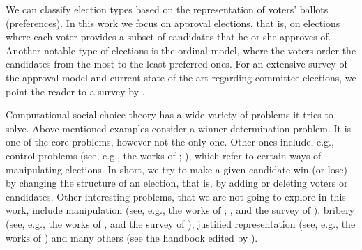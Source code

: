 We can classify election types based on the representation of voters' ballots (preferences).
In this work we focus on approval elections, that is, on elections where each voter provides a subset of candidates that he or she approves of.
Another notable type of elections is the ordinal model,
where the voters order the candidates from the most to the least preferred ones. 
For an extensive survey of the approval model and current state of the art
regarding committee elections, we point the reader to a survey by \cite{lacknerSkowronAVOverview}. 

Computational social choice theory has a wide variety of problems it tries to solve.
Above-mentioned examples consider a winner determination problem. It is one of the core problems, however not the only one.
Other ones include,
e.g.,
control problems (see, e.g., the works of \cite{bartholdi-control}; \cite{hemaspaandra-control}),
which refer to certain ways of manipulating elections.
In short, we try to make a given candidate win (or lose) by changing the structure of an election,
that is, by adding or deleting voters or candidates.
Other interesting problems, that we are not going to explore in this work,
include
manipulation (see, e.g., the works of \cite{bartholdi-manipulation}; \cite{faliszewski-procaccia-manipulation}, and the survey of \cite{walsh-manipulation-hcsc}),
bribery (see, e.g., the works of \cite{faliszewski-bribery}, and the survey of \cite{control-hcsc-faliszewski}),
justified representation (see, e.g., the works of \cite{aziz-representation})
and many others (see the handbook edited by \cite{handbook-csc}).


